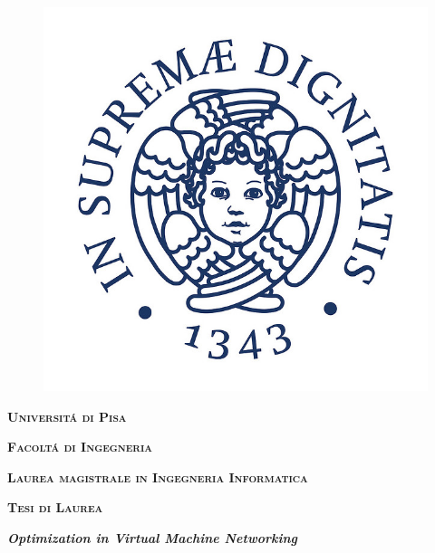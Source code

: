 \begin{titlepage}
\pagestyle{empty}
\begingroup
\vspace*{-8.5\topskip}

\begin{figure}[!h]
\begin{center}
\includegraphics[scale=0.3]{logo_unipi}
\end{center}
\end{figure}

\vspace*{-0.5cm}

\begin{center}
        \large{\bf\expandafter\textsc {Universit\'a di Pisa}}\par 
		  \large{\bf\expandafter\textsc {Facolt\'a di Ingegneria}}\par
		  \large{\bf\expandafter\textsc {Laurea magistrale in Ingegneria Informatica}}\par
        \vspace{0.5cm}
        \large{\bf\expandafter\textsc {Tesi di Laurea}}
\end{center}



\vspace{1.5cm}
\begin{center}
        {\LARGE\bf\textit{Optimization in Virtual Machine Networking}}
\end{center}


\end{titlepage}

